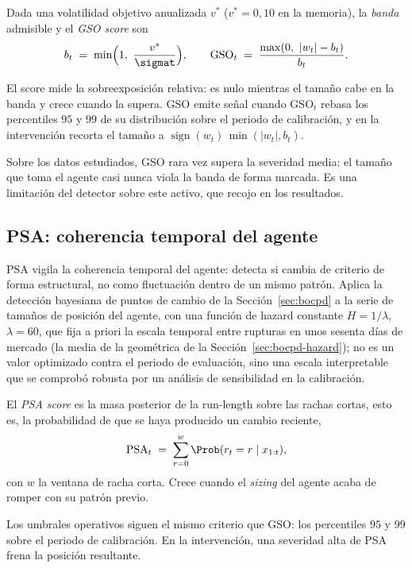 \begin{definicion}
\label{def:gso}
Dada una volatilidad objetivo anualizada $v^{\ast}$ ($v^{\ast}=0{,}10$ en la memoria), la \emph{banda} admisible y el \emph{GSO score} son
\[
b_t \;=\; \min\!\Big(1,\ \frac{v^{\ast}}{\sigmat}\Big),
\qquad
\mathrm{GSO}_t \;=\; \frac{\max(0,\ |w_t| - b_t)}{b_t}.
\]
\end{definicion}

El score mide la sobreexposición relativa: es nulo mientras el tamaño cabe en la banda y crece cuando la supera. GSO emite señal cuando $\mathrm{GSO}_t$ rebasa los percentiles $95$ y $99$ de su distribución sobre el periodo de calibración, y en la intervención recorta el tamaño a $\operatorname{sign}(w_t)\,\min(|w_t|, b_t)$.

Sobre los datos estudiados, GSO rara vez supera la severidad media: el tamaño que toma el agente casi nunca viola la banda de forma marcada. Es una limitación del detector sobre este activo, que recojo en los resultados.

\subsection{PSA: coherencia temporal del agente}
\label{sec:strata-psa}

PSA vigila la coherencia temporal del agente: detecta si cambia de criterio de forma estructural, no como fluctuación dentro de un mismo patrón. Aplica la detección bayesiana de puntos de cambio de la Sección~\ref{sec:bocpd} a la serie de tamaños de posición del agente, con una función de hazard constante $H = 1/\lambda$, $\lambda = 60$, que fija a priori la escala temporal entre rupturas en unos sesenta días de mercado (la media de la geométrica de la Sección~\ref{sec:bocpd-hazard}); no es un valor optimizado contra el periodo de evaluación, sino una escala interpretable que se comprobó robusta por un análisis de sensibilidad en la calibración.

\begin{definicion}
\label{def:psa}
El \emph{PSA score} es la masa posterior de la run-length sobre las rachas cortas, esto es, la probabilidad de que se haya producido un cambio reciente,
\[
\mathrm{PSA}_t \;=\; \sum_{r=0}^{w} \Prob(r_t = r \mid x_{1:t}),
\]
con $w$ la ventana de racha corta. Crece cuando el \emph{sizing} del agente acaba de romper con su patrón previo.
\end{definicion}

Los umbrales operativos siguen el mismo criterio que GSO: los percentiles $95$ y $99$ sobre el periodo de calibración. En la intervención, una severidad alta de PSA frena la posición resultante.

